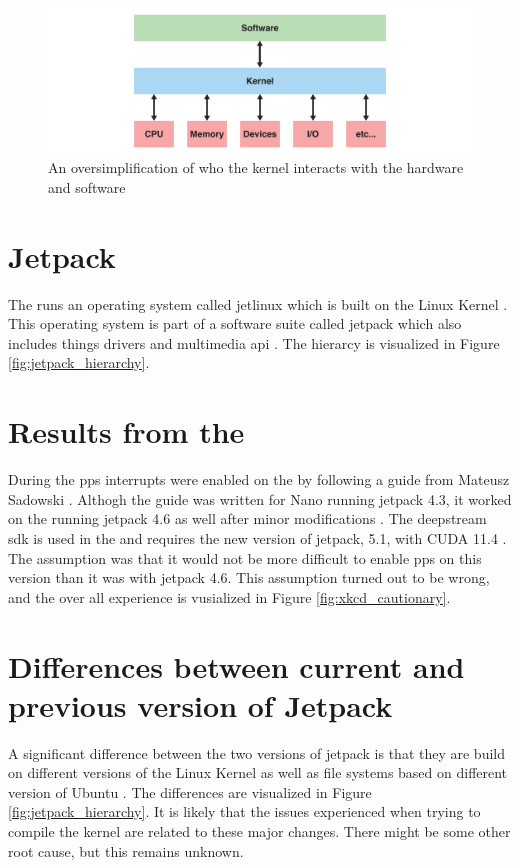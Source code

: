\begin{figure}[H]
    \centering
    \includegraphics[width=\textwidth]{figures/kernel.pdf}
    \caption{An oversimplification of who the kernel interacts with the hardware and software}
    \label{fig:kernel_visualization}
\end{figure}

\section{Jetpack}
\review
The \jx runs an operating system called \gls{jetlinux} which is built on the Linux Kernel \cite{JetsonLinux352023}.
This operating system is part of a software suite called \gls{jetpack} which also includes things \cuda drivers and multimedia \gls{api} \cite{nvidiaJetPackSDK2023}.
The hierarcy is visualized in Figure \ref{fig:jetpack_hierarchy}.

\section{Results from the \preproject}
During the \preproject \gls{pps} interrupts were enabled on the \jx by following a guide from Mateusz Sadowski \cite{sadowskiEnablingPPSJetson2020} \cite[26]{martensPortableSensorRig2022}.
Althogh the guide was written for \jetson Nano running \gls{jetpack} 4.3, it worked on the \jx running \gls{jetpack} 4.6 as well after minor modifications \cite{sadowskiEnablingPPSJetson2020} \cite[26]{martensPortableSensorRig2022}.
The \gls{deepstream} \gls{sdk} is used in the \master and requires the new version of \gls{jetpack}, 5.1, with CUDA 11.4 \cite{nvidiaDeepStreamSDKGet2019}.
The assumption was that it would not be more difficult to enable \gls{pps} on this version than it was with \gls{jetpack} 4.6.
This assumption turned out to be wrong, and the over all experience is vusialized in Figure \ref{fig:xkcd_cautionary}.

\section{Differences between current and previous version of Jetpack}
A significant difference between the two versions of \gls{jetpack} is that they are build on different versions of the Linux Kernel as well as file systems based on different version of Ubuntu \cite{nvidiaJetPackSDK2022} \cite{nvidiaJetPackSDK2023}.
The differences are visualized in Figure \ref{fig:jetpack_hierarchy}.
It is likely that the issues experienced when trying to compile the kernel are related to these major changes.
There might be some other root cause, but this remains unknown.

